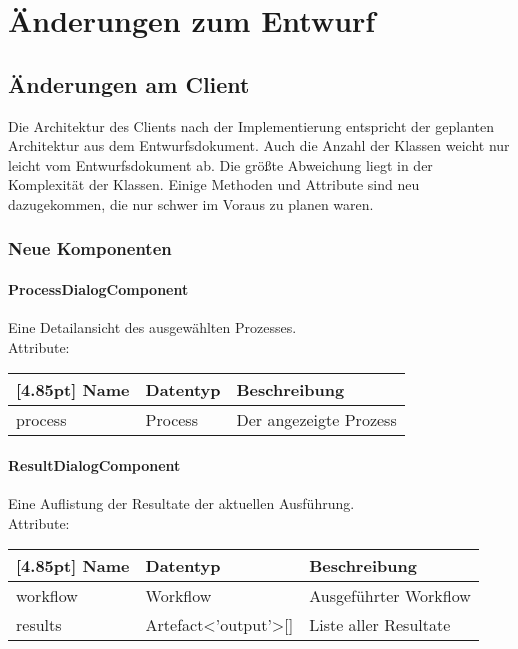 \chapter{Änderungen zum Entwurf}
    
    \section{Änderungen am Client}
        Die Architektur des Clients nach der Implementierung entspricht der geplanten Architektur aus dem Entwurfsdokument. Auch die Anzahl der Klassen weicht nur leicht vom Entwurfsdokument ab. Die größte Abweichung liegt in der Komplexität der Klassen. Einige Methoden und Attribute sind neu dazugekommen, die nur schwer im Voraus zu planen waren.
        
        \subsection{Neue Komponenten}
            \subsubsection{ProcessDialogComponent}
                Eine Detailansicht des ausgewählten Prozesses. \\
                
    			Attribute:
    			\begin{center}
    				\renewcommand{\arraystretch}{1.5}
    				\setlength\tabcolsep{5pt}
    				\begin{tabularx}{\textwidth}{|l|l|X|}
    					\hline
    					\rowcolor[gray]{0.90}[4.85pt]	
    					Name & Datentyp & Beschreibung \\ \hline
    					process & Process & Der angezeigte Prozess \\ \hline
    				\end{tabularx}
    			\end{center}
    			
    	    \subsubsection{ResultDialogComponent}
                Eine Auflistung der Resultate der aktuellen Ausführung. \\
                
    			Attribute:
    			\begin{center}
    				\renewcommand{\arraystretch}{1.5}
    				\setlength\tabcolsep{5pt}
    				\begin{tabularx}{\textwidth}{|l|l|X|}
    					\hline
    					\rowcolor[gray]{0.90}[4.85pt]		
    					Name & Datentyp & Beschreibung \\ \hline
    					workflow & Workflow & Ausgeführter Workflow \\ \hline
    					results & Artefact<'output'>[] & Liste aller Resultate \\ \hline
    				\end{tabularx}
    			\end{center}
    			
